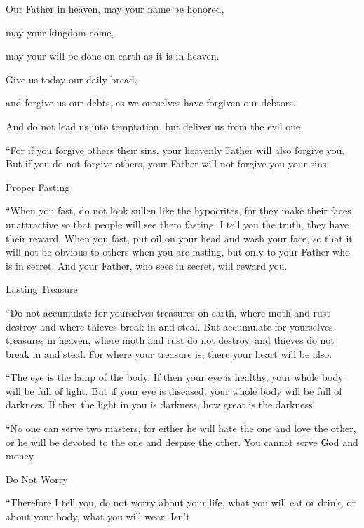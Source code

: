 {\par }{\Q Our
Father
in
heaven,
may
your
name
be honored,
\par }{\Q {}may
your
kingdom
come,
\par }{\Q may
your
will be
done
on
earth
as
it is in
heaven.
\par }{\Q {}Give
us
today
our
daily
bread,
\par }{\Q {}and
forgive
us
our
debts,
as
we
ourselves have forgiven
our
debtors.
\par }{\Q {}And
do
not
lead
us
into
temptation,
but
deliver
us
from
the evil one.
\par }{\PP {}“For
if
you forgive
others
their
sins,
your
heavenly
Father
will
also
forgive
you.
But
if
you do
not
forgive
others,
your
Father
will
not
forgive
you your
sins.
\par }{\SH Proper Fasting
\par }{\PP {}“When
you fast,
do not
look
sullen
like
the hypocrites,
for
they make
their
faces
unattractive
so that people
will see them fasting.
I tell
you
the truth,
they have
their
reward.
When you
fast,
put oil
on your
head
and
wash
your
face,
so that
it will not
be obvious
to others
when
you are fasting,
but
only to your
Father
who is in
secret.
And
your
Father,
who sees
in
secret,
will reward
you.
\par }{\SH Lasting Treasure
\par }{\PP {}“Do
not
accumulate
for yourselves
treasures
on
earth,
where
moth
and
rust
destroy
and
where
thieves
break in
and
steal.
But
accumulate
for yourselves
treasures
in
heaven,
where
moth
and rust
do not
destroy,
and
thieves
do
not
break in
and steal.
For
where
your
treasure
is,
there
your
heart
will be
also.
\par }{\PP {}“The eye
is
the lamp
of the body.
If
then
your
eye
is
healthy,
your
whole
body
will be
full of light.
But
if
your
eye
is
diseased,
your
whole
body
will be
full of darkness. If
then
the light
in
you
is
darkness,
how great
is the darkness!
\par }{\PP {}“No one
can
serve
two
masters,
for
either
he will hate
the one
and
love
the other,
or
he will be devoted
to the one
and
despise
the other.
You cannot
serve
God
and
money.
\par }{\SH Do Not Worry
\par }{\PP {}“Therefore
I tell
you,
do
not
worry
about your
life,
what
you will eat
or drink,
or
about your
body,
what
you will wear.
Isn’t
}
